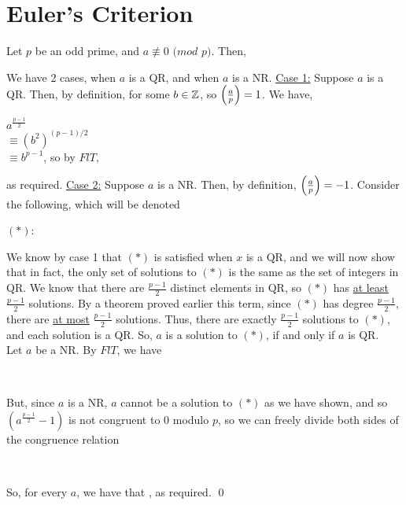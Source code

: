 \documentclass[../main.tex]{subfiles}
\begin{document}
\section{Euler's Criterion}
\begin{thm}
    Let $p$ be an odd prime, and $a \not\equiv 0$ $(mod$ $p)$. Then, \\
    \centerline{}
\end{thm}
\begin{pf}
    We have 2 cases, when $a$ is a QR, and when $a$ is a NR. \sspace
    \underline{Case 1:} Suppose $a$ is a QR. Then, by definition,  for some $b \in \mathbb{Z}$, so $\Big(\frac{a}{p}\Big)=1$. We have,
    \begin{center}
        $a^{\tfrac{p-1}{2}}$ \\
        $\equiv (b^2)^{(p-1)/2}$ \\
        $\equiv b^{p-1}$, so by $FlT,$ \\
    \end{center}
    as required. \sspace
    \underline{Case 2:} Suppose $a$ is a NR. Then, by definition, $\Big(\frac{a}{p}\Big)=-1$. Consider the following, which will be denoted \\
    \centerline{$(*)$: }
\end{pf}
\begin{pf}[cont.]
    We know by case 1 that $(*)$ is satisfied when $x$ is a QR, and we will now show that in fact, the only set of solutions to $(*)$ is the same as the set of integers in QR. We know that there are $\tfrac{p-1}{2}$ distinct elements in QR, so $(*)$ has \underline{at least} $\tfrac{p-1}{2}$ solutions. By a theorem proved earlier this term, since $(*)$ has degree $\tfrac{p-1}{2}$, there are \underline{at most} $\tfrac{p-1}{2}$ solutions. Thus, there are exactly $\tfrac{p-1}{2}$ solutions to $(*)$, and each solution is a QR. So, $a$ is a solution to $(*)$, if and only if $a$ is QR. \\
    Let $a$ be a NR. By $FlT$, we have 
    \begin{center}
         \\
    \end{center}
    But, since $a$ is a NR, $a$ cannot be a solution to $(*)$ as we have shown, and so $(a^{\tfrac{p-1}{2}}-1)$ is not congruent to 0 modulo $p$, so we can freely divide both sides of the congruence relation
    \begin{center}
         \\
    \end{center}
     So, for every $a$, we have that , as required. \qed
\end{pf}
\end{document}
